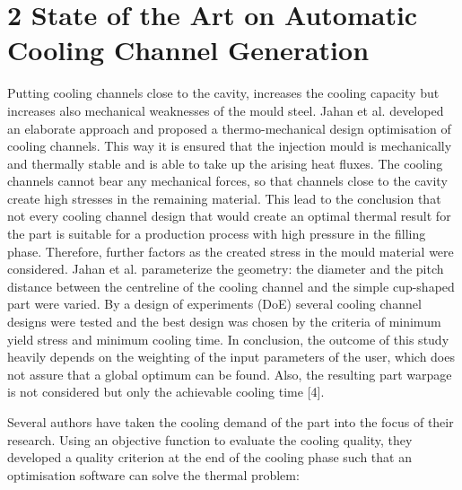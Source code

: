 \documentclass[10pt]{article}
\begin{document}
\section*{2 State of the Art on Automatic Cooling Channel Generation}
Putting cooling channels close to the cavity, increases the cooling capacity but increases also mechanical weaknesses of the mould steel. Jahan et al. developed an elaborate approach and proposed a thermo-mechanical design optimisation of cooling channels. This way it is ensured that the injection mould is mechanically and thermally stable and is able to take up the arising heat fluxes. The cooling channels cannot bear any mechanical forces, so that channels close to the cavity create high stresses in the remaining material. This lead to the conclusion that not every cooling channel design that would create an optimal thermal result for the part is suitable for a production process with high pressure in the filling phase. Therefore, further factors as the created stress in the mould material were considered. Jahan et al. parameterize the geometry: the diameter and the pitch distance between the centreline of the cooling channel and the simple cup-shaped part were varied. By a design of experiments (DoE) several cooling channel designs were tested and the best design was chosen by the criteria of minimum yield stress and minimum cooling time. In conclusion, the outcome of this study heavily depends on the weighting of the input parameters of the user, which does not assure that a global optimum can be found. Also, the resulting part warpage is not considered but only the achievable cooling time [4].

Several authors have taken the cooling demand of the part into the focus of their research. Using an objective function to evaluate the cooling quality, they developed a quality criterion at the end of the cooling phase such that an optimisation software can solve the thermal problem:
\end{document}
